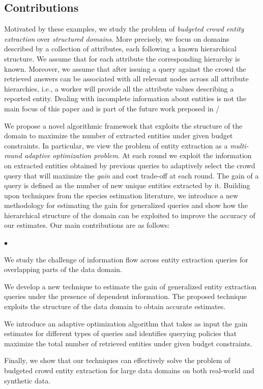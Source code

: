 \documentclass{vldb}
\newcommand{\squishlist}{
   \begin{list}{$\bullet$}
    {
      \setlength{\itemsep}{0pt}
      \setlength{\parsep}{3pt}
      \setlength{\topsep}{3pt}
      \setlength{\partopsep}{0pt}
      \setlength{\leftmargin}{1.5em}
      \setlength{\labelwidth}{1em}
      \setlength{\labelsep}{0.5em} } }
\newcommand{\squishend}{
    \end{list}  }
\begin{document}
\subsection{Contributions}
\label{sec:contributions}
Motivated by these examples, we study the problem of {\em budgeted crowd entity extraction} over {\em structured domains}. More precisely, we focus on domains described by a collection of attributes, each following a known hierarchical structure. We assume that for each attribute the corresponding hierarchy is known. Moreover, we assume that after issuing a query against the crowd the retrieved answers can be associated with all relevant nodes across all attribute hierarchies, i.e., a worker will provide all the attribute values describing a reported entity. Dealing with incomplete information about entities is not the main focus of this paper and is part of the future work preposed in /

We propose a novel algorithmic framework that exploits the structure of the domain to maximize the number of extracted entities under given budget constraints. In particular, we view the problem of entity extraction as a {\em multi-round adaptive optimization problem}. At  each round we exploit the information on extracted entities obtained by previous queries to adaptively select the crowd query that will maximize the {\em gain} and cost trade-off at each round. The gain of a query is defined as the number of new unique entities extracted by it. Building upon techniques from the species estimation literature, we introduce a new methodology for estimating the gain for generalized queries and show how the hierarchical structure of the domain can be exploited to improve the accuracy of our estimates. Our main contributions are as follows:

\squishlist
\item We study the challenge of information flow across entity extraction queries for overlapping parts of the data domain.
\item We develop a new technique to estimate the gain of generalized entity extraction queries under the presence of dependent information. The proposed technique exploits the structure of the data domain to obtain accurate estimates. 
\item We introduce an adaptive optimization algorithm that takes as input the gain estimates for different types of queries and identifies querying policies that maximize the total number of retrieved entities under given budget constraints. 
\item Finally, we show that our techniques can effectively solve the problem of budgeted crowd entity extraction for large data domains on both real-world and synthetic data.
\squishend
\end{document}

